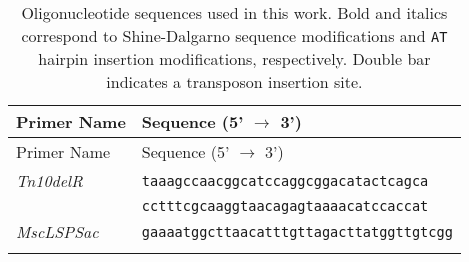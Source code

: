 \begin{longtable}[]{@{}ll@{}}
\caption{Oligonucleotide
sequences
used
in
this
work.
Bold
and
italics
correspond
to
Shine-Dalgarno
sequence
modifications
and
\texttt{AT}
hairpin
insertion
modifications,
respectively.
Double
bar
\texttt{\textbar{}\textbar{}}
indicates
a
transposon
insertion
site.}\tabularnewline
\toprule
\begin{minipage}[b]{0.27\columnwidth}\raggedright\strut
Primer
Name\strut
\end{minipage}
&
\begin{minipage}[b]{0.67\columnwidth}\raggedright\strut
Sequence
(5'
\(\rightarrow\)
3')\strut
\end{minipage}\tabularnewline
\midrule
\endfirsthead
\toprule
\begin{minipage}[b]{0.27\columnwidth}\raggedright\strut
Primer
Name\strut
\end{minipage}
&
\begin{minipage}[b]{0.67\columnwidth}\raggedright\strut
Sequence
(5'
\(\rightarrow\)
3')\strut
\end{minipage}\tabularnewline
\midrule
\endhead
\begin{minipage}[t]{0.27\columnwidth}\raggedright\strut
\emph{Tn10delR}\strut
\end{minipage}
&
\begin{minipage}[t]{0.67\columnwidth}\raggedright\strut
\texttt{taaagccaacggcatccaggcggacatactcagca\textbar{}\textbar{}}\strut
\end{minipage}\tabularnewline
\begin{minipage}[t]{0.27\columnwidth}\raggedright\strut
\strut
\end{minipage}
&
\begin{minipage}[t]{0.67\columnwidth}\raggedright\strut
\texttt{cctttcgcaaggtaacagagtaaaacatccaccat}\strut
\end{minipage}\tabularnewline
\begin{minipage}[t]{0.27\columnwidth}\raggedright\strut
\emph{MscLSPSac}\strut
\end{minipage}
&
\begin{minipage}[t]{0.67\columnwidth}\raggedright\strut
\texttt{gaaaatggcttaacatttgttagacttatggttgtcgg}\strut
\end{minipage}\tabularnewline
\begin{minipage}[t]{0.27\columnwidth}\raggedright\strut
\strut
\end{minipage}
&
\begin{minipage}[t]{0.67\columnwidth}\raggedright\strut

\end{minipage}
\end{longtable}
